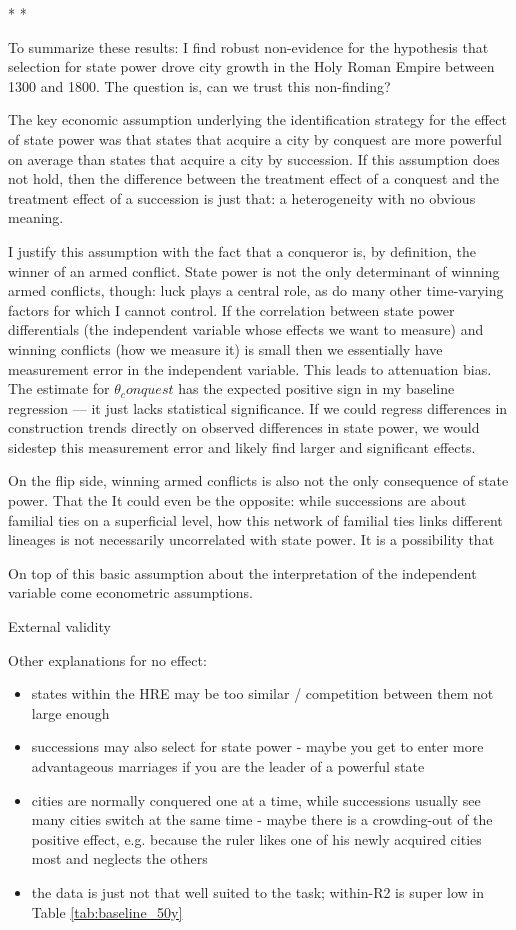 \documentclass[11pt, a4paper]{article}
\newcommand{\decoline}{%
  \par
  \vspace{0.33\baselineskip}
  \hfill
  {\large* * *}
  \hfill
  \vspace{0.33\baselineskip}
\par}
\begin{document}
\decoline

To summarize these results: I find robust non-evidence for the hypothesis that selection for state power drove city growth in the Holy Roman Empire between 1300 and 1800. The question is, can we trust this non-finding?

The key economic assumption underlying the identification strategy for the effect of state power was that states that acquire a city by conquest are more powerful on average than states that acquire a city by succession. If this assumption does not hold, then the difference between the treatment effect of a conquest and the treatment effect of a succession is just that: a heterogeneity with no obvious meaning.

I justify this assumption with the fact that a conqueror is, by definition, the winner of an armed conflict. State power is not the only determinant of winning armed conflicts, though: luck plays a central role, as do many other time-varying factors for which I cannot control. If the correlation between state power differentials (the independent variable whose effects we want to measure) and winning conflicts (how we measure it) is small then we essentially have measurement error in the independent variable. This leads to attenuation bias. The estimate for $\theta_conquest$ has the expected positive sign in my baseline regression --- it just lacks statistical significance. If we could regress differences in construction trends directly on observed differences in state power, we would sidestep this measurement error and likely find larger and significant effects.

On the flip side, winning armed conflicts is also not the only consequence of state power. 
That the 
It could even be the opposite: while successions are about familial ties on a superficial level, how this network of familial ties links different lineages is not necessarily uncorrelated with state power. It is a possibility that 

On top of this basic assumption about the interpretation of the independent variable come econometric assumptions.

External validity


Other explanations for no effect:
\begin{itemize}
    \item states within the HRE may be too similar / competition between them not large enough
    \item successions may also select for state power - maybe you get to enter more advantageous marriages if you are the leader of a powerful state
    \item cities are normally conquered one at a time, while successions usually see many cities switch at the same time - maybe there is a crowding-out of the positive effect, e.g. because the ruler likes one of his newly acquired cities most and neglects the others
    \item the data is just not that well suited to the task; within-R2 is super low in Table \ref{tab:baseline_50y}
\end{itemize}
\end{document}
